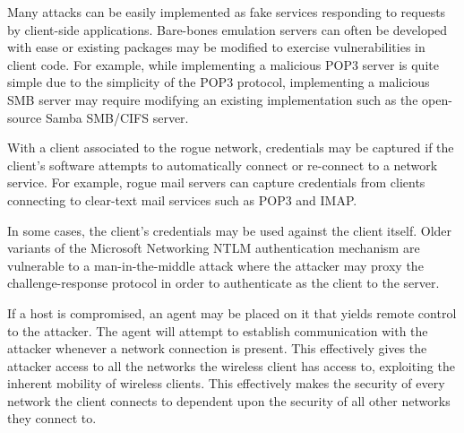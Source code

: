 \documentclass[10pt,twocolumn]{article}
\begin{document}
Many attacks can be easily implemented as fake services responding to
requests by client-side applications.  Bare-bones emulation servers
can often be developed with ease \cite{provos04honeyd} or existing
packages may be modified to exercise vulnerabilities in client code.
For example, while implementing a malicious POP3 server is quite
simple due to the simplicity of the POP3 protocol, implementing a
malicious SMB server may require modifying an existing implementation
such as the open-source Samba SMB/CIFS server\cite{samba}.

With a client associated to the rogue network, credentials may be
captured if the client's software attempts to automatically connect or
re-connect to a network service.  For example, rogue mail servers can
capture credentials from clients connecting to clear-text
mail services such as POP3 and IMAP.  

In some cases, the client's
credentials may be used against the client itself.  Older variants of
the Microsoft Networking NTLM authentication mechanism are vulnerable
to a man-in-the-middle attack where the attacker may proxy the
challenge-response protocol in order to authenticate as the client to
the server.

If a host is compromised, an agent may be placed on it that yields
remote control to the attacker.  The agent will attempt to establish
communication with the attacker whenever a network connection is
present.  This effectively gives the attacker access to all the
networks the wireless client has access to, exploiting the inherent
mobility of wireless clients.  This effectively makes the security of
every network the client connects to dependent upon the security of
all other networks they connect to.


 
\end{document}
